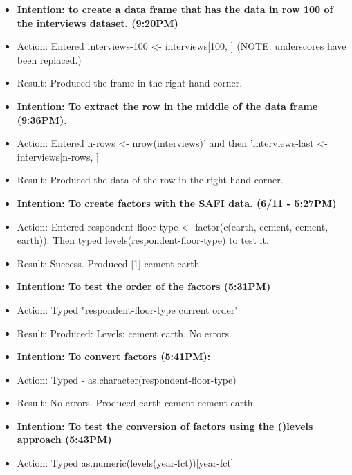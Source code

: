 \documentclass[a4paper,12pt]{article}
\begin{document}
\begin{itemize}
\item \textbf{Intention: to create a data frame that has the data in row 100 of the interviews dataset. (9:20PM)}


\item Action: Entered interviews-100 <- interviews[100, ] (NOTE: underscores have been replaced.)


\item Result: Produced the frame in the right hand corner. 


\item \textbf{Intention: To extract the row in the middle of the data frame (9:36PM).}


\item Action: Entered n-rows <- nrow(interviews)' and then 'interviews-last <- interviews[n-rows, ]


\item Result: Produced the data of the row in the right hand corner.


\item \textbf{Intention: To create factors with the SAFI data. (6/11 - 5:27PM)}


\item Action: Entered respondent-floor-type <- factor(c(earth, cement, cement, earth)). Then typed levels(respondent-floor-type) to test it.


\item Result: Success. Produced [1] cement earth


\item \textbf{Intention: To test the order of the factors (5:31PM)}


\item Action: Typed "respondent-floor-type current order" 


\item Result: Produced: Levels: cement earth. No errors. 


\item \textbf{Intention: To convert factors (5:41PM):}


\item Action: Typed - as.character(respondent-floor-type)


\item Result: No errors. Produced earth  cement cement earth 


\item \textbf{Intention: To test the conversion of factors using the ()levels approach (5:43PM)}


\item Action: Typed as.numeric(levels(year-fct))[year-fct]



\end{itemize}
\end{document}
